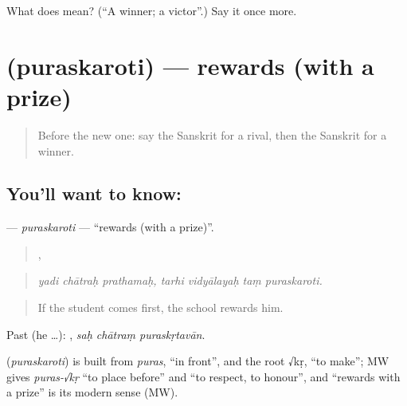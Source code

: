 \begin{tcolorbox}[breakable,colback=teal!4,colframe=teal!35!black,title={Before you move on}]
What does  mean? (\textquotedblleft{}A winner; a victor\textquotedblright{}.) Say it once more.
\end{tcolorbox}
\section[\texorpdfstring{\sk{पुरस्करोति} (puraskaroti)}{पुरस्करोति (puraskaroti)}]{ (puraskaroti) — rewards (with a prize)}

\label{lesson:SA-C385-puraskaroti}



\begin{quote}
Before the new one: say the Sanskrit for a rival, then the Sanskrit for a winner.
\end{quote}

\subsection*{You'll want to know: }
\textbf{} — \emph{puraskaroti} — \textquotedblleft{}rewards (with a prize)\textquotedblright{}.

\begin{quote}
  ,    
\end{quote}

\begin{quote}
\emph{yadi chātraḥ prathamaḥ, tarhi vidyālayaḥ taṃ puraskaroti.}
\end{quote}

\begin{quote}
If the student comes first, the school rewards him.
\end{quote}

Past (he …):   , \emph{saḥ chātraṃ puraskṛtavān}.

\begin{cousinweb}
\textbf{} (\emph{puraskaroti}) is built from \emph{puras}, \textquotedblleft{}in front\textquotedblright{}, and the root √kṛ, \textquotedblleft{}to make\textquotedblright{}; MW gives \emph{puras-√kṛ} \textquotedblleft{}to place before\textquotedblright{} and \textquotedblleft{}to respect, to honour\textquotedblright{}, and \textquotedblleft{}rewards with a prize\textquotedblright{} is its modern sense (MW).
\end{cousinweb}

